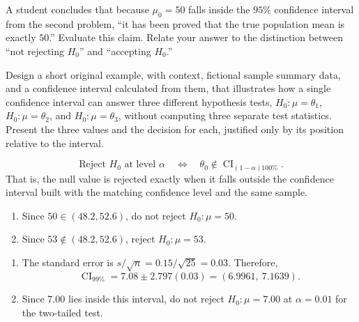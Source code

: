 \begin{problema}\label{prob:4f1ea6b}
A student concludes that because $\mu_0=50$ falls inside the $95\%$ confidence interval from the second problem, ``it has been proved that the true population mean is exactly $50$.'' Evaluate this claim. Relate your answer to the distinction between ``not rejecting $H_0$'' and ``accepting $H_0$.''
\end{problema}

\begin{problema}\label{prob:1e58b99}
Design a short original example, with context, fictional sample summary data, and a confidence interval calculated from them, that illustrates how a single confidence interval can answer three different hypothesis tests, $H_0:\mu=\theta_1$, $H_0:\mu=\theta_2$, and $H_0:\mu=\theta_3$, without computing three separate test statistics. Present the three values and the decision for each, justified only by its position relative to the interval.
\end{problema}

\begin{solproblema}
\[
	\text{Reject }H_0\text{ at level }\alpha
	\quad\Longleftrightarrow\quad
	\theta_0\notin \operatorname{CI}_{(1-\alpha)100\%}.
\]
That is, the null value is rejected exactly when it falls outside the confidence interval built with the matching confidence level and the same sample.
\end{solproblema}

\begin{solproblema}[prob:ae1a813]
\begin{enumerate}[label=(\alph*)]
	\item Since $50\in(48.2,52.6)$, do not reject $H_0:\mu=50$.
	\item Since $53\notin(48.2,52.6)$, reject $H_0:\mu=53$.
\end{enumerate}
\end{solproblema}

\begin{solproblema}[prob:1b375b0]
\begin{enumerate}[label=(\alph*)]
	\item The standard error is $s/\sqrt n=0.15/\sqrt{25}=0.03$. Therefore,
	\[
		\operatorname{CI}_{99\%}=7.08\pm2.797(0.03)
		=(6.9961,\ 7.1639).
	\]
	\item Since $7.00$ lies inside this interval, do not reject $H_0:\mu=7.00$ at $\alpha=0.01$ for the two-tailed test.
\end{enumerate}
\end{solproblema}

